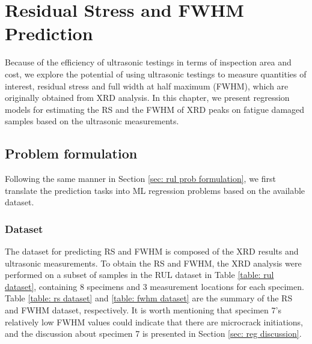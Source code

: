 \chapter{Residual Stress and FWHM Prediction}
\label{chap: reg}

Because of the efficiency of ultrasonic testings in terms of inspection area and cost, we explore the potential of using ultrasonic testings to measure quantities of interest, residual stress and full width at half maximum (FWHM), which are originally obtained from XRD analysis. In this chapter, we present regression models for estimating the RS and the FWHM of XRD peaks on fatigue damaged samples based on the ultrasonic measurements. 

\section{Problem formulation}
Following the same manner in Section \ref{sec: rul prob formulation}, we first translate the prediction tasks into ML regression problems based on the available dataset.

\subsection{Dataset}
The dataset for predicting RS and FWHM is composed of the XRD results and ultrasonic measurements. To obtain the RS and FWHM, the XRD analysis were performed on a subset of samples in the RUL dataset in Table \ref{table: rul dataset}, containing 8 specimens and 3 measurement locations for each specimen. Table \ref{table: rs dataset} and \ref{table: fwhm dataset} are the summary of the RS and FWHM dataset, respectively. It is worth mentioning that specimen 7's relatively low FWHM values could indicate that there are microcrack initiations, and the discussion about specimen 7 is presented in Section \ref{sec: reg discussion}.


